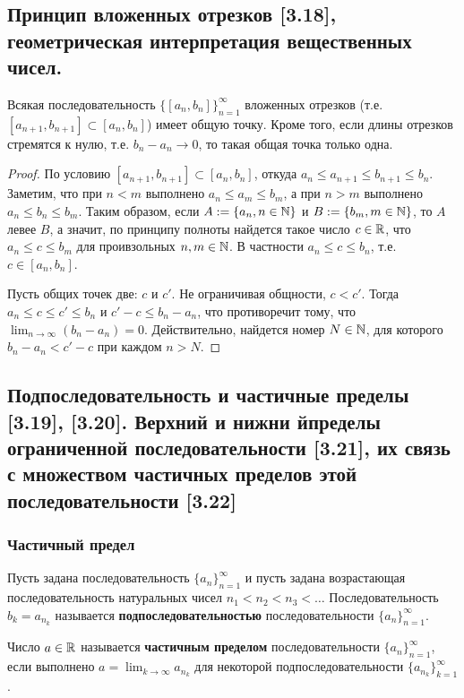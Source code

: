 \documentclass[12pt, a4paper]{article}
\begin{document}
    \subsection{Принцип вложенных отрезков [3.18], геометрическая интерпретация вещественных чисел.}
    Всякая последовательность $\{[a_n, b_n]\}^{\infty}_{n=1}$ вложенных отрезков (т.е. $[a_{n + 1}, b_{n + 1}] \subset [a_n, b_n]$) имеет общую точку. Кроме того, если длины отрезков стремятся к нулю, т.е. $b_n - a_n \to 0$, то такая общая точка только одна.
    \begin{proof}
    По условию $[a_{n + 1}, b_{n + 1}] \subset [a_n, b_n]$, откуда $a_n \leq a_{n + 1} \leq b_{n + 1} \leq b_n$. Заметим, что при $n < m$ выполнено $a_n \leq a_m \leq b_m$, а при $n > m$ выполнено $a_n \leq b_n \leq b_m$. Таким образом, если $A := \{a_n, n \in \mathbb{N}\}$ и $B := \{b_m, m \in \mathbb{N}\}$, то $A$ левее $B$, а значит, по принципу полноты найдется такое число $c \in \mathbb{R}$, что $a_n \leq c \leq b_m$ для проивзольных $n, m \in \mathbb{N}$. В частности $a_n \leq c \leq b_n$, т.е. $c \in [a_n, b_n]$.

    Пусть общих точек две: $c$ и $c'$. Не ограничивая общности, $c < c'$. Тогда $a_n \leq c \leq c' \leq b_n$ и $c' - c \leq b_n - a_n$, что противоречит тому, что $\lim_{n \to \infty} (b_n - a_n) = 0$. Действительно, найдется номер $N \in \mathbb{N}$, для которого $b_n - a_n < c' - c$ при каждом $n > N$.
    \end{proof}
    \subsection{Подпоследовательность и частичные пределы [3.19], [3.20]. Верхний и нижни йпределы ограниченной последовательности [3.21], их связь с множеством частичных пределов этой последовательности [3.22]}
    \subsubsection{Частичный предел}
     Пусть задана последовательность $\{a_n\}^{\infty}_{n=1}$ и пусть задана возрастающая последовательность натуральных чисел $n_1 < n_2 < n_3 < \dots$ Последовательность $b_k = a_{n_k}$ называется \textbf{подпоследовательностью} последовательности $\{a_n\}^{\infty}_{n=1}$.

    Число $a \in \mathbb{R}$ называется \textbf{частичным пределом} последовательности $\{a_n\}^{\infty}_{n=1}$, если выполнено $a =  \lim_{k \to \infty} a_{n_k}$ для некоторой подпоследовательности $\{a_{n_k}\}^{\infty}_{k=1}$.
\end{document}
